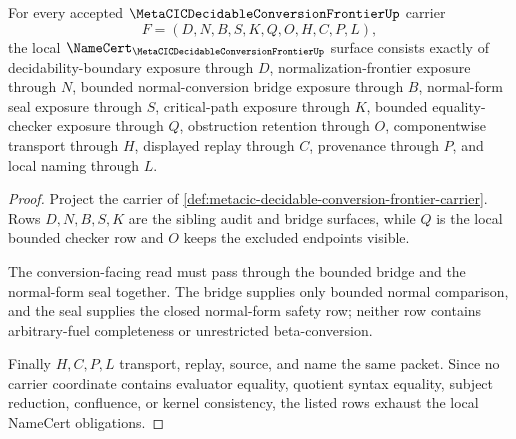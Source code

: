 \begin{theorem}
\label{thm:metacic-decidable-conversion-frontier-namecert-obligations}
For every accepted $\MetaCICDecidableConversionFrontierUp$ carrier
$$
F=(D,N,B,S,K,Q,O,H,C,P,L),
$$
the local $\NameCert_{\MetaCICDecidableConversionFrontierUp}$ surface consists exactly of decidability-boundary exposure through $D$, normalization-frontier exposure through $N$, bounded normal-conversion bridge exposure through $B$, normal-form seal exposure through $S$, critical-path exposure through $K$, bounded equality-checker exposure through $Q$, obstruction retention through $O$, componentwise transport through $H$, displayed replay through $C$, provenance through $P$, and local naming through $L$.
\end{theorem}
\begin{proof}
Project the carrier of \autoref{def:metacic-decidable-conversion-frontier-carrier}. Rows $D,N,B,S,K$ are the sibling audit and bridge surfaces, while $Q$ is the local bounded checker row and $O$ keeps the excluded endpoints visible.

The conversion-facing read must pass through the bounded bridge and the normal-form seal together. The bridge supplies only bounded normal comparison, and the seal supplies the closed normal-form safety row; neither row contains arbitrary-fuel completeness or unrestricted beta-conversion.

Finally $H,C,P,L$ transport, replay, source, and name the same packet. Since no carrier coordinate contains evaluator equality, quotient syntax equality, subject reduction, confluence, or kernel consistency, the listed rows exhaust the local NameCert obligations.
\end{proof}


